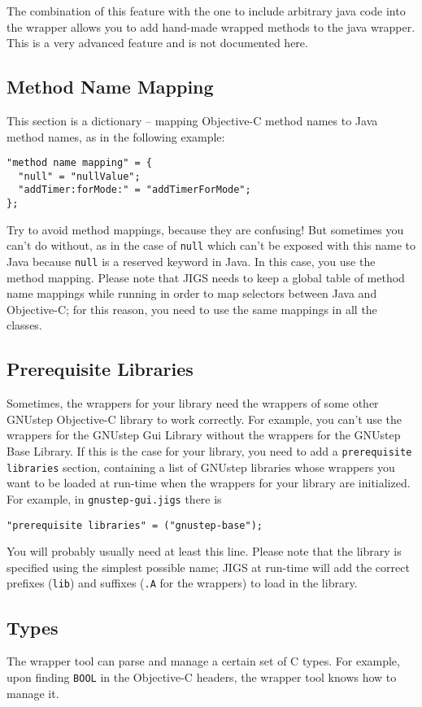 The combination of this feature with the one to include arbitrary java
code into the wrapper allows you to add hand-made wrapped methods to
the java wrapper.  This is a very advanced feature and is not
documented here.

\subsection{Method Name Mapping}
This section is a dictionary -- mapping Objective-C method names 
to Java method names, as in the following example:
\begin{verbatim}
"method name mapping" = {
  "null" = "nullValue";
  "addTimer:forMode:" = "addTimerForMode";
};
\end{verbatim}
Try to avoid method mappings, because they are confusing!  But
sometimes you can't do without, as in the case of \texttt{null} which
can't be exposed with this name to Java because \texttt{null} is a
reserved keyword in Java.  In this case, you use the method mapping.
Please note that JIGS needs to keep a global table of method name
mappings while running in order to map selectors between Java and
Objective-C; for this reason, you need to use the same mappings in all
the classes.

\subsection{Prerequisite Libraries}
Sometimes, the wrappers for your library need the wrappers of some
other GNUstep Objective-C library to work correctly.  For example, you
can't use the wrappers for the GNUstep Gui Library without the
wrappers for the GNUstep Base Library.  If this is the case for your
library, you need to add a \texttt{prerequisite libraries} section,
containing a list of GNUstep libraries whose wrappers you want to be
loaded at run-time when the wrappers for your library are initialized.
For example, in \texttt{gnustep-gui.jigs} there is
\begin{verbatim}
"prerequisite libraries" = ("gnustep-base");
\end{verbatim}
You will probably usually need at least this line.  Please note that
the library is specified using the simplest possible name; JIGS at
run-time will add the correct prefixes (\texttt{lib}) and suffixes
(\texttt{.A} for the wrappers) to load in the library.

\subsection{Types}
The wrapper tool can parse and manage a certain set of C types.  For
example, upon finding \texttt{BOOL} in the Objective-C headers, the
wrapper tool knows how to manage it.

